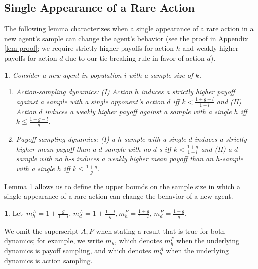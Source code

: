 \documentclass[12pt]{article}
\numberwithin{equation}{section}
\numberwithin{figure}{section}
\theoremstyle{definition}
\newtheorem{defn}{\protect\definitionname}
\theoremstyle{plain}
\theoremstyle{plain}
\theoremstyle{plain}
\theoremstyle{remark}
\theoremstyle{plain}
\newtheorem{lem}{\protect\lemmaname}
\theoremstyle{plain}
\providecommand{\definitionname}{Definition}
\providecommand{\lemmaname}{Lemma}
\begin{document}
\subsection{Single Appearance of a Rare Action}
The following lemma characterizes when a single appearance of a rare action in a new agent's sample can change the agent's behavior (see the proof in Appendix \ref{lem-proof}; 
we require strictly higher payoffs for action $h$ and weakly higher payoffs for action $d$ due to our tie-breaking rule in favor of action $d$).

\begin{lem}
\label{lemma-sample} Consider a new agent in population $i$ with a sample size of $k$.
\begin{enumerate}
\item Action-sampling dynamics: (I) Action $h$ induces a 
strictly higher payoff
against a sample with a single opponent's action $d$ iff
$k<\frac{1+g-l}{1-l}$ 
and (II) Action $d$ induces a
weakly higher payoff against a sample
with a single $h$ iff $k\leq \frac{1+g-l}{g}$. 
\item Payoff-sampling dynamics: (I) a $h$-sample with a single $d$
induces a
strictly higher mean payoff than a $d$-sample with no $d$-s
iff $k<\frac{1+g}{1-l}$ and (II) a $d$-sample with no $h$-s
induces a weakly higher mean payoff than an $h$-sample with a single
$h$ iff $k\leq \frac{1+g}{g}$. 
\end{enumerate}
\end{lem}

Lemma \ref{lemma-sample} allows us to define the 
upper bounds on the sample size in which a single appearance of a rare action can change the behavior of a new agent.

\begin{defn}\label{def:maximal-samples}
Let 
 $\,m_{h}^{A}= 1+\frac{g}{1-l} ,\,m_{d}^{A}= 1+\frac{1-l}{g},
 m_{h}^{P}= \frac{1+g}{1-l} ,\,m_{d}^{P}= \frac{1+g}{g}.$
 
\end{defn}
    We omit the superscript ${A,P}$ when stating a result that is true for both dynamics; for example, we write $m_h$, which denotes $m_h^P$ when the underlying dynamics is payoff sampling, and which denotes $m_h^A$ when the underlying dynamics is action sampling. 
    
\end{document}
